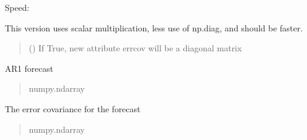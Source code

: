 \documentclass[letterpaper,10pt,english]{sphinxmanual}
\begin{document}
\begin{fulllineitems}
\begin{fulllineitems}
\sphinxAtStartPar
Speed:

\sphinxAtStartPar
This version uses scalar multiplication, less use of np.diag, and should
be faster.
\begin{quote}\begin{description}
\sphinxAtStartPar
{} () \textendash{} If True, new attribute errcov will be a diagonal matrix

\end{description}\end{quote}

\begin{fulllineitems}
\label{\detokenize{kalman:glomar_gridding.autoregressive_kalman.Autoregressive1ForecastUncorr.forecast}}
\pysigstartsignatures
\pysigline
{}
\pysigstopsignatures
\sphinxAtStartPar
AR1 forecast
\begin{quote}\begin{description}
\sphinxAtStartPar
numpy.ndarray

\end{description}\end{quote}

\end{fulllineitems}


\begin{fulllineitems}
\label{\detokenize{kalman:glomar_gridding.autoregressive_kalman.Autoregressive1ForecastUncorr.errcov}}
\pysigstartsignatures
\pysigline
{}
\pysigstopsignatures
\sphinxAtStartPar
The error covariance for the forecast
\begin{quote}\begin{description}
\sphinxAtStartPar
numpy.ndarray

\end{description}\end{quote}

\end{fulllineitems}


\end{fulllineitems}


\end{fulllineitems}
\end{document}
